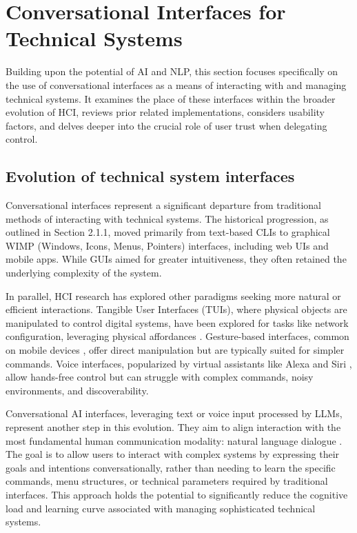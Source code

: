 \section{Conversational Interfaces for Technical Systems}
Building upon the potential of AI and NLP, this section focuses specifically on the use of conversational interfaces as a means of interacting with and managing technical systems. It examines the place of these interfaces within the broader evolution of HCI, reviews prior related implementations, considers usability factors, and delves deeper into the crucial role of user trust when delegating control.

\subsection{Evolution of technical system interfaces}
Conversational interfaces represent a significant departure from traditional methods of interacting with technical systems. The historical progression, as outlined in Section 2.1.1, moved primarily from text-based CLIs to graphical WIMP (Windows, Icons, Menus, Pointers) interfaces, including web UIs and mobile apps. While GUIs aimed for greater intuitiveness, they often retained the underlying complexity of the system.

In parallel, HCI research has explored other paradigms seeking more natural or efficient interactions. Tangible User Interfaces (TUIs), where physical objects are manipulated to control digital systems, have been explored for tasks like network configuration, leveraging physical affordances \cite{home_network_challenges}. Gesture-based interfaces, common on mobile devices \cite{ai_mediated_interface}, offer direct manipulation but are typically suited for simpler commands. Voice interfaces, popularized by virtual assistants like Alexa and Siri \cite{parental_controls_value}, allow hands-free control but can struggle with complex commands, noisy environments, and discoverability.

Conversational AI interfaces, leveraging text or voice input processed by LLMs, represent another step in this evolution. They aim to align interaction with the most fundamental human communication modality: natural language dialogue \cite{ai_mediated_interface}. The goal is to allow users to interact with complex systems by expressing their goals and intentions conversationally, rather than needing to learn the specific commands, menu structures, or technical parameters required by traditional interfaces. This approach holds the potential to significantly reduce the cognitive load and learning curve associated with managing sophisticated technical systems.

